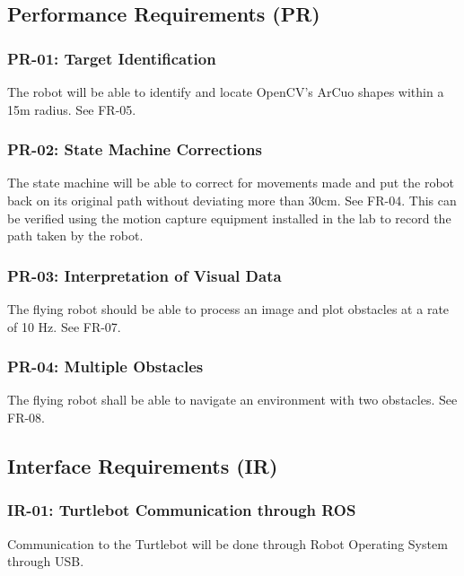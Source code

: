 \documentclass{article}
\begin{document}
	\subsection{Performance Requirements (PR)}
	
		\subsubsection{PR-01: Target Identification}
		
		The robot will be able to identify and locate OpenCV's ArCuo shapes within a 15m radius. See FR-05.
		
		\subsubsection{PR-02: State Machine Corrections}
		
		The state machine will be able to correct for movements made and put the robot back on its original path without deviating more than 30cm. See FR-04. This can be verified using the motion capture equipment installed in the lab to record the path taken by the robot.
		
		\subsubsection{PR-03: Interpretation of Visual Data}
		
		The flying robot should be able to process an image and plot obstacles at a rate of 10 Hz. See FR-07.
		
		\subsubsection{PR-04: Multiple Obstacles}
		
		The flying robot shall be able to navigate an environment with two obstacles. See FR-08.
		
	\subsection{Interface Requirements (IR)}
	
		\subsubsection{IR-01: Turtlebot Communication through ROS}
		
		Communication to the Turtlebot will be done through Robot Operating System through USB.
		
\end{document}
